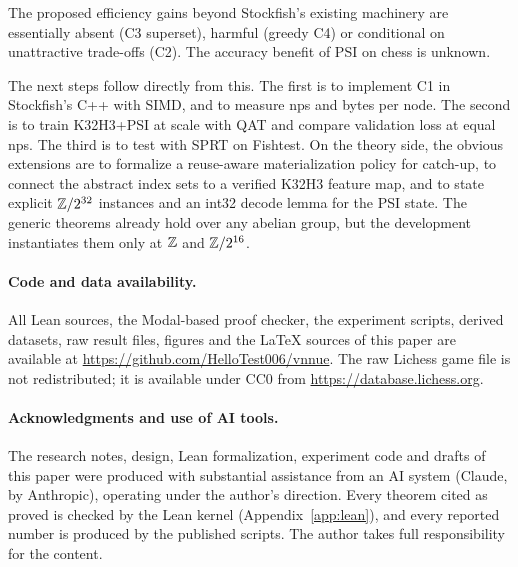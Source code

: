 The proposed efficiency gains beyond Stockfish's existing machinery are essentially absent (C3 superset), harmful (greedy C4) or conditional on unattractive trade-offs (C2).
The accuracy benefit of PSI on chess is unknown.

The next steps follow directly from this.
The first is to implement C1 in Stockfish's C++ with SIMD, and to measure nps and bytes per node.
The second is to train K32H3+PSI at scale with QAT and compare validation loss at equal nps.
The third is to test with SPRT on Fishtest.
On the theory side, the obvious extensions are to formalize a reuse-aware materialization policy for catch-up, to connect the abstract index sets to a verified K32H3 feature map, and to state explicit $\mathbb{Z}/2^{32}$ instances and an int32 decode lemma for the PSI state. The generic theorems already hold over any abelian group, but the development instantiates them only at $\mathbb{Z}$ and $\mathbb{Z}/2^{16}$.

\paragraph{Code and data availability.}
All Lean sources, the Modal-based proof checker, the experiment scripts, derived datasets, raw result files, figures and the \LaTeX{} sources of this paper are available at \url{https://github.com/HelloTest006/vnnue}.
The raw Lichess game file is not redistributed; it is available under CC0 from \url{https://database.lichess.org}.

\paragraph{Acknowledgments and use of AI tools.}
The research notes, design, Lean formalization, experiment code and drafts of this paper were produced with substantial assistance from an AI system (Claude, by Anthropic), operating under the author's direction.
Every theorem cited as proved is checked by the Lean kernel (Appendix~\ref{app:lean}), and every reported number is produced by the published scripts.
The author takes full responsibility for the content.



